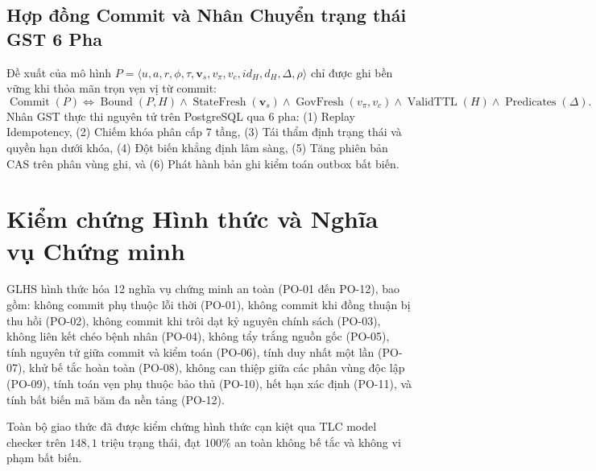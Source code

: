 \documentclass[11pt,a4paper]{article}
\begin{document}
\subsection{Hợp đồng Commit và Nhân Chuyển trạng thái GST 6 Pha}
Đề xuất của mô hình $P = \langle u, a, r, \phi, \tau, \mathbf{v}_s, v_{\pi}, v_c, id_H, d_H, \Delta, \rho \rangle$ chỉ được ghi bền vững khi thỏa mãn trọn vẹn vị từ commit:
\begin{equation}
\operatorname{Commit}(P) \iff \operatorname{Bound}(P, H) \land \operatorname{StateFresh}(\mathbf{v}_s) \land \operatorname{GovFresh}(v_{\pi}, v_c) \land \operatorname{ValidTTL}(H) \land \operatorname{Predicates}(\Delta).
\label{eq:commit_predicate_vi}
\end{equation}
Nhân GST thực thi nguyên tử trên PostgreSQL qua 6 pha: (1) Replay Idempotency, (2) Chiếm khóa phân cấp 7 tầng, (3) Tái thẩm định trạng thái và quyền hạn dưới khóa, (4) Đột biến khẳng định lâm sàng, (5) Tăng phiên bản CAS trên phân vùng ghi, và (6) Phát hành bản ghi kiểm toán outbox bất biến.

\section{Kiểm chứng Hình thức và Nghĩa vụ Chứng minh}
GLHS hình thức hóa 12 nghĩa vụ chứng minh an toàn (PO-01 đến PO-12), bao gồm: không commit phụ thuộc lỗi thời (PO-01), không commit khi đồng thuận bị thu hồi (PO-02), không commit khi trôi dạt kỷ nguyên chính sách (PO-03), không liên kết chéo bệnh nhân (PO-04), không tẩy trắng nguồn gốc (PO-05), tính nguyên tử giữa commit và kiểm toán (PO-06), tính duy nhất một lần (PO-07), khử bế tắc hoàn toàn (PO-08), không can thiệp giữa các phân vùng độc lập (PO-09), tính toán vẹn phụ thuộc bảo thủ (PO-10), hết hạn xác định (PO-11), và tính bất biến mã băm đa nền tảng (PO-12).

Toàn bộ giao thức đã được kiểm chứng hình thức cạn kiệt qua TLC model checker trên $148{,}1\text{ triệu}$ trạng thái, đạt $100\%$ an toàn không bế tắc và không vi phạm bất biến.
\end{document}
